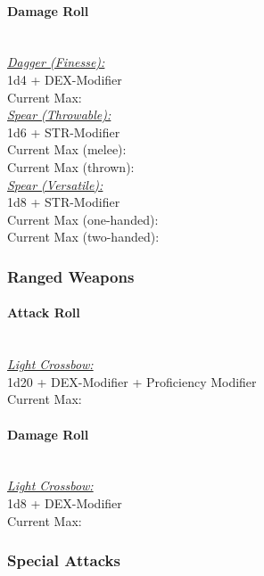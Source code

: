 \documentclass[letterpaper,openany,oneside,twocolumn]{book}
\begin{document}
\paragraph*{Damage Roll}\hfill\\
\underline{\textit{Dagger (Finesse):}}\\
1d4 + DEX-Modifier\\
\indent Current Max: 
\\
\underline{\textit{Spear (Throwable):}}\\
1d6 + STR-Modifier\\
\indent Current Max (melee): \\
\indent Current Max (thrown): 
\\
\underline{\textit{Spear (Versatile):}}\\
1d8 + STR-Modifier\\
\indent Current Max (one-handed): \\
\indent Current Max (two-handed): 
\subsubsection*{Ranged Weapons}
\paragraph*{Attack Roll}\hfill\\
\underline{\textit{Light Crossbow:}}\\
1d20 + DEX-Modifier + Proficiency Modifier\\
\indent Current Max: 
\paragraph*{Damage Roll}\hfill\\
\underline{\textit{Light Crossbow:}}\\
1d8 + DEX-Modifier\\
\indent Current Max: 
\subsubsection*{Special Attacks}
\end{document}
